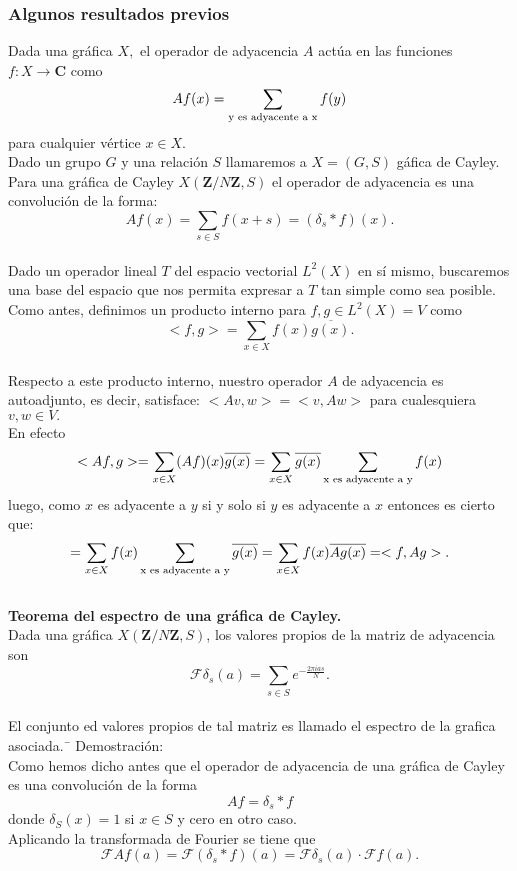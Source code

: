 \documentclass[a4paper,openright,10pt]{article}
\begin{document}
\subsubsection{Algunos resultados previos}
Dada una gr\'afica $X,$ el operador de adyacencia $A$ act\'ua en las funciones $f: X \rightarrow \mathbf{C}$ como $$
Af(x)=\sum\limits_{\textnormal{y es adyacente a x}}f(y)
$$ para cualquier v\'ertice $x\in X.$\\
Dado un grupo $G$ y una relaci\'on $S$ llamaremos a $X=(G,S)$ g\'afica de Cayley.\\
Para una gr\'afica de Cayley $X(\mathbf{Z}/N\mathbf{Z},S)$ el operador de adyacencia es una convoluci\'on de la forma: $$
Af(x)=\sum\limits_{s\in S} f(x+s)=(\delta_{s}*f)(x).$$\\
Dado un operador lineal $T$ del espacio vectorial $L^{2}(X)$ en s\'i mismo, buscaremos una base del espacio que nos permita expresar a $T$ tan simple como sea posible.\\
Como antes, definimos un producto interno para $f,g \in L^{2}(X)=V$ como $$<f,g>=\sum\limits_{x\in X}f(x)\overline {g(x)}.$$\\
Respecto a este producto interno, nuestro operador $A$ de adyacencia es autoadjunto, es decir, satisface: $<Av,w>=<v,Aw>$ para cualesquiera $v,w \in V.$\\
En efecto $$
<Af,g>=\sum\limits_{x\in X} (Af)(x) \overline{g(x)}=\sum\limits_{x\in X}\overline{g(x)} \sum\limits_{\textnormal{x es adyacente a y}} f(x) 
$$ luego, como $x$ es adyacente a $y$ si y solo si $y$ es adyacente a $x$ entonces es cierto que: $$
=\sum\limits_{x\in X}f(x) \sum\limits_{\textnormal{x es adyacente a y}} \overline{g(x)}=\sum\limits_{x\in X} f(x) \overline{Ag(x)}=<f,Ag>.
$$\\
\textbf{Teorema del espectro de una gr\'afica de Cayley.}\\
Dada una gr\'afica $X(\mathbf{Z}/N\mathbf{Z},S)$, los valores propios de la matriz de adyacencia son $$\mathcal{F} \delta_{s}(a)=\sum\limits_{s\in S}e^{-\frac{2\pi ias}{N}}.$$\\
El conjunto ed valores propios de tal matriz es llamado el espectro de la grafica asociada.¯
Demostraci\'on:\\
Como hemos dicho antes que el operador de adyacencia de una gr\'afica de Cayley es una convoluci\'on de la forma $$Af=\delta_{s}*f$$ donde $\delta_{S}(x)=1$ si $x\in S$ y cero en otro caso.\\
Aplicando la transformada de Fourier se tiene que $$
\mathcal{F}Af(a)=\mathcal{F}(\delta_{s}*f)(a)=\mathcal{F}\delta_{s}(a)\cdot \mathcal{F}f(a).$$\\
\end{document}
